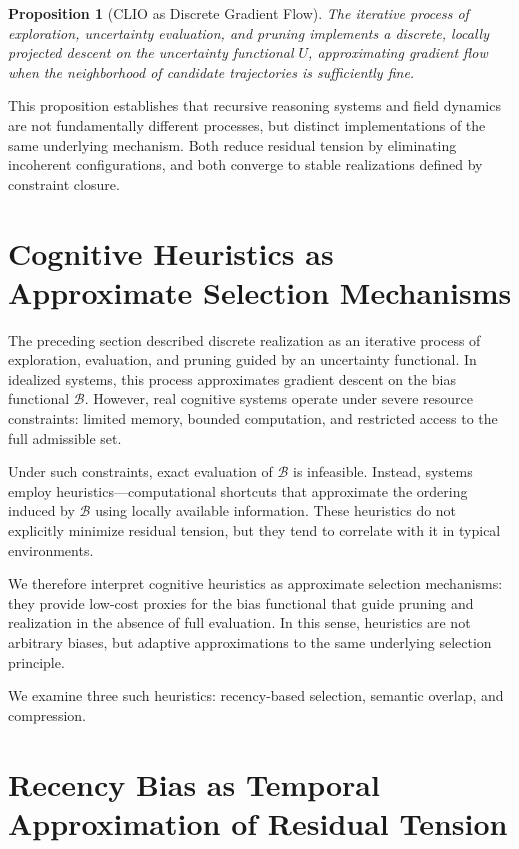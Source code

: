 \documentclass[11pt]{article}
\theoremstyle{plain}
\newtheorem{proposition}[theorem]{Proposition}
\theoremstyle{definition}
\theoremstyle{remark}
\begin{document}
\begin{proposition}[CLIO as Discrete Gradient Flow]
The iterative process of exploration, uncertainty evaluation, and pruning implements a discrete, locally projected descent on the uncertainty functional $U$, approximating gradient flow when the neighborhood of candidate trajectories is sufficiently fine.
\end{proposition}

This proposition establishes that recursive reasoning systems and field dynamics are not fundamentally different processes, but distinct implementations of the same underlying mechanism. Both reduce residual tension by eliminating incoherent configurations, and both converge to stable realizations defined by constraint closure.

\section{Cognitive Heuristics as Approximate Selection Mechanisms}

The preceding section described discrete realization as an iterative process of exploration, evaluation, and pruning guided by an uncertainty functional. In idealized systems, this process approximates gradient descent on the bias functional $\mathcal{B}$. However, real cognitive systems operate under severe resource constraints: limited memory, bounded computation, and restricted access to the full admissible set.

Under such constraints, exact evaluation of $\mathcal{B}$ is infeasible. Instead, systems employ heuristics---computational shortcuts that approximate the ordering induced by $\mathcal{B}$ using locally available information. These heuristics do not explicitly minimize residual tension, but they tend to correlate with it in typical environments.

We therefore interpret cognitive heuristics as approximate selection mechanisms: they provide low-cost proxies for the bias functional that guide pruning and realization in the absence of full evaluation. In this sense, heuristics are not arbitrary biases, but adaptive approximations to the same underlying selection principle.

We examine three such heuristics: recency-based selection, semantic overlap, and compression.

\section{Recency Bias as Temporal Approximation of Residual Tension}
\end{document}
